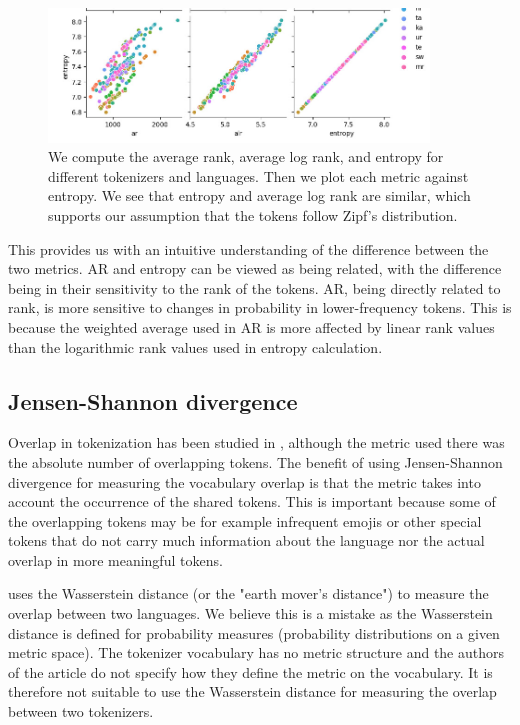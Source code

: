 \begin{figure}
    \centering
    \includegraphics[width=0.9\textwidth]{img/temp/ar_alr_entropy.jpg}
    \caption{We compute the average rank, average log rank, and entropy for different tokenizers and languages. Then we plot each metric against entropy. We see that entropy and average log rank are similar, which supports our assumption that the tokens follow Zipf's distribution.}
    \label{fig:ar_alr_entropy}
\end{figure}

This provides us with an intuitive understanding of the difference between the two metrics. AR and entropy can be viewed as being related, with the difference being in their sensitivity to the rank of the tokens. AR, being directly related to rank, is more sensitive to changes in probability in lower-frequency tokens. This is because the weighted average used in AR is more affected by linear rank values than the logarithmic rank values used in entropy calculation.

\subsection{Jensen-Shannon divergence}

Overlap in tokenization has been studied in \citet{wu_beto_2019}, although the metric used there was the absolute number of overlapping tokens. The benefit of using Jensen-Shannon divergence for measuring the vocabulary overlap is that the metric takes into account the occurrence of the shared tokens. This is important because some of the overlapping tokens may be for example infrequent emojis or other special tokens that do not carry much information about the language nor the actual overlap in more meaningful tokens.

\citet{chung_improving_2020} uses the Wasserstein distance (or the "earth mover's distance") to measure the overlap between two languages. We believe this is a mistake as the Wasserstein distance is defined for probability measures (probability distributions on a given metric space). The tokenizer vocabulary has no metric structure and the authors of the article do not specify how they define the metric on the vocabulary. It is therefore not suitable to use the Wasserstein distance for measuring the overlap between two tokenizers.


